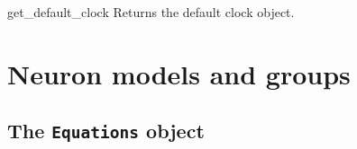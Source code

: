 \documentclass[letterpaper,10pt,english]{manual}
\begin{document}
\hypertarget{brian.get_default_clock}{}\begin{funcdesc}{get\_default\_clock}{}
Returns the default clock object.
\end{funcdesc}

\resetcurrentobjects
\hypertarget{--doc-reference-models-and-groups}{}

\hypertarget{index-90}{}\section{Neuron models and groups}

\hypertarget{index-91}{}\subsection{The \texttt{Equations} object}
\end{document}
